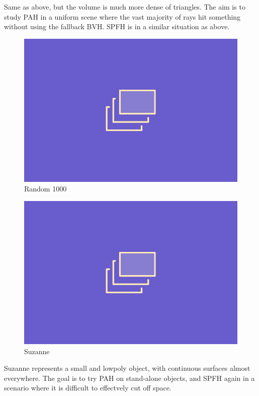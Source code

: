 \documentclass{PoliMi_MasterThesis}
\begin{document}
\begin{minipage}{0.55\textwidth}
	Same as above, but the volume is much more dense of triangles. The aim is to study PAH in a uniform scene where the vast majority of rays hit something without using the fallback BVH. SPFH is in a similar situation as above.
\end{minipage}
\hfill \begin{minipage}{0.4\textwidth}
	\begin{figure}[H]
		\includegraphics[width=\textwidth]{Images/TODO.png}
		\caption{Random 1000}
		\label{fig:random_1000}
	\end{figure}
\end{minipage}

\begin{minipage}{0.4\textwidth}
	\begin{figure}[H]
		\includegraphics[width=\textwidth]{Images/TODO.png}
		\caption{Suzanne}
		\label{fig:suzanne}
	\end{figure}
\end{minipage} \hfill
\begin{minipage}{0.55\textwidth}
	Suzanne represents a small and lowpoly object, with continuous surfaces almost everywhere. The goal is to try PAH on stand-alone objects, and SPFH again in a scenario where it is difficult to effectvely cut off space.
\end{minipage}
\end{document}
